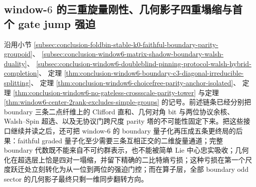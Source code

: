 \subsection{window-\texorpdfstring{$6$}{6} 的三重旋量刚性、几何影子四重塌缩与首个 gate jump 强迫}\label{subsec:conclusion-window6-boundary-spinor-shadow-gatejump-rigidity}

沿用小节 \ref{subsec:conclusion-foldbin-stable-k0-faithful-boundary-parity-groupoid}、
\ref{subsec:conclusion-window6-matrix-shadow-boundary-walsh-duality}、
\ref{subsec:conclusion-window6-doubleblind-pinning-protocol-walsh-hybrid-completion}、
定理 \ref{thm:conclusion-window6-boundary-c3-diagonal-irreducible-splitting}、
定理 \ref{thm:conclusion-window6-choicefree-parity-anchor-isolated}、
定理 \ref{thm:conclusion-window6-no-gateless-crossscale-parity-tower}
与定理 \ref{thm:window6-center-2rank-excludes-simple-groups} 的记号。前述链条已经分别把 boundary 三条二点纤维上的 Clifford 直和、几何对角 bit 与两位协议余核、Walsh--Spin 超选、以及无协议门跨尺度 parity 塔的不可能性固定下来。把这些接口继续并读之后，还可把 window-\(6\) 的 boundary 量子化再压成五条更终局的后果：faithful graded 量子化至少需要三条互相正交的二维旋量通道；完整 boundary 代数既不能来自不可约群表示，也不能被简单 Lie 中心忠实吸收；几何化在超选层上恰是四对一塌缩，并留下精确的二比特熵亏损；这种亏损在第一个尺度跃迁处立刻转化为从一位到两位的强迫门控；而在算子层，全部 boundary odd sector 的几何影子最终只剩一维同步翻转方向。


